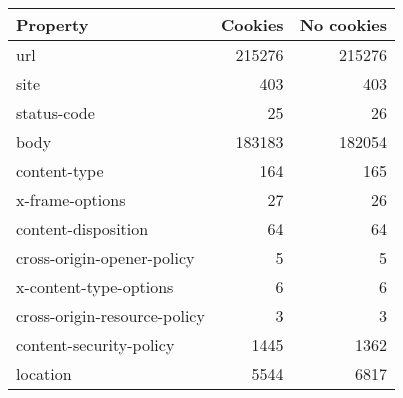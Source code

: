 \begin{tabular}{lrr}
\toprule
                    Property &  Cookies &  No cookies \\
\midrule
                         url &   215276 &      215276 \\
                        site &      403 &         403 \\
                 status-code &       25 &          26 \\
                        body &   183183 &      182054 \\
                content-type &      164 &         165 \\
             x-frame-options &       27 &          26 \\
         content-disposition &       64 &          64 \\
  cross-origin-opener-policy &        5 &           5 \\
      x-content-type-options &        6 &           6 \\
cross-origin-resource-policy &        3 &           3 \\
     content-security-policy &     1445 &        1362 \\
                    location &     5544 &        6817 \\
\bottomrule
\end{tabular}
